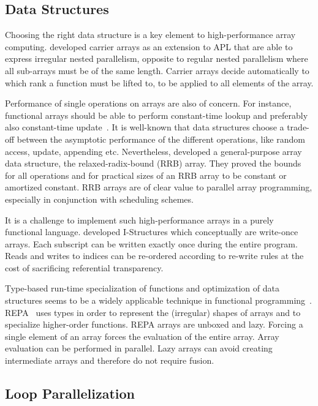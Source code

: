 \documentclass[a4paper]{article}
\begin{document}
\subsection{Data Structures}
\label{sec:data-structures}

Choosing the right data structure is a key element to high-performance
array computing. \citet{Lowney:1981:CAI:567532.567533} developed
carrier arrays as an extension to APL that are able to express
irregular nested parallelism, opposite to regular nested parallelism
where all sub-arrays must be of the same length. Carrier arrays decide
automatically to which rank a function must be lifted to, to be
applied to all elements of the array.

Performance of single operations on arrays are also of concern. For
instance, functional arrays should be able to perform constant-time
lookup and preferably also constant-time update~\cite{47507}. It is
well-known that data structures choose a trade-off between the
asymptotic performance of the different operations, like random
access, update, appending etc. Nevertheless,
\citet{Stucki:2015:RVP:2784731.2784739} developed a general-purpose
array data structure, the relaxed-radix-bound (RRB) array. They proved
the bounds for all operations and for practical sizes of an RRB array
to be constant or amortized constant. RRB arrays are of clear value to
parallel array programming, especially in conjunction with scheduling
schemes.

It is a challenge to implement such high-performance arrays in a
purely functional language. \citet{Arvind:1989:IDS:69558.69562}
developed I-Structures which conceptually are write-once arrays. Each
subscript can be written exactly once during the entire program. Reads
and writes to indices can be re-ordered according to re-write rules at
the cost of sacrificing referential transparency.

Type-based run-time specialization of functions and optimization of
data structures seems to be a widely applicable technique in
functional
programming~\cite{Hall:1994:UHT:182409.156781}. REPA~\cite{Keller:2010:RSP:1863543.1863582}
uses types in order to represent the (irregular) shapes of arrays and
to specialize higher-order functions. REPA arrays are unboxed and
lazy. Forcing a single element of an array forces the evaluation of
the entire array. Array evaluation can be performed in parallel. Lazy
arrays can avoid creating intermediate arrays and therefore do not
require fusion.

\subsection{Loop Parallelization}
\label{sec:loop-parallelization}
\end{document}
